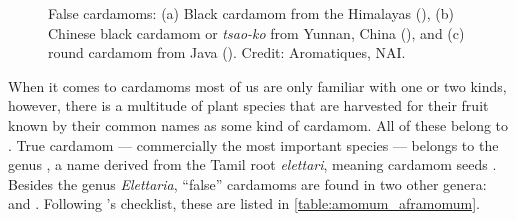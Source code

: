 \begin{figure}[!ht]
	\vspace{-2ex}
	\centering
    \hfill
    \hfill
	\caption[False cardamoms]{False cardamoms: (a) Black cardamom from the Himalayas (), (b) Chinese black cardamom or \textit{tsao-ko} from Yunnan, China (), and (c) round cardamom from Java (). Credit: Aromatiques, NAI.}
	\label{fig:black_cardamom_imgs}
\end{figure}

When it comes to cardamoms most of us are only familiar with one or two kinds, however, there is a multitude of plant species that are harvested for their fruit known by their common names as some kind of cardamom. All of these belong to . True cardamom --- commercially the most important species --- belongs to the genus , a name derived from the Tamil root \textit{elettari}, meaning cardamom seeds \autocite[1]{ravindran_cardamom_2002}. Besides the genus \textit{Elettaria}, ``false'' cardamoms are found in two other genera:  and . Following \textcite[290-308]{van_wyk_culinary_2014}'s checklist, these are listed in \cref{table:amomum_aframomum}.

